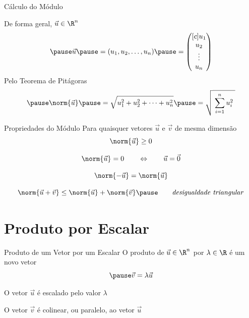\documentclass[fleqn,utf8,aspectratio=169,12pt]{beamer}
\begin{document}
\begin{frame}[t]{Cálculo do Módulo}
  \vspace{1\baselineskip}

  De forma geral, $\vec{u} \in \R^n$
  \[
    \pause
    \vec{u}
    \pause
    = ( u_1, u_2, \dots, u_n )
    \pause
    = \begin{pmatrix}[c]
      u_1 \\
      u_2 \\
      \vdots \\
      u_n
    \end{pmatrix}
  \]
  \pause
  Pelo Teorema de Pitágoras
  \[
    \pause
    \norm{\vec{u}}
    \pause
    = \sqrt{ u_1^2 + u_2^2 + \cdots + u_n^2 }
    \pause
    = \sqrt{ \; \sum_{i=1}^{n} u_i^2 \; }
  \]
\end{frame}

\begin{frame}{Propriedades do Módulo}
  Para quaisquer vetores $\vec{u}$ e $\vec{v}$ de mesma dimensão
  \pause
  \[
    \norm{\vec{u}} \geq 0
  \]

  \pause
  \[
    \norm{\vec{u}} = 0
    \qquad\Leftrightarrow\qquad
    \vec{u} = \vec{0}
  \]

  \pause
  \[
    \norm{-\vec{u}} = \norm{\vec{u}}
  \]

  \pause
  \[
    \norm{\vec{u}+\vec{v}}
    \leq
    \norm{\vec{u}} + \norm{\vec{v}}
    \pause
    \qquad
    \text{\emph{desigualdade triangular}}
  \]
\end{frame}




\section{Produto por Escalar}

\begin{frame}{Produto de um Vetor por um Escalar}
  O produto de $\vec{u} \in \R^n$
  \pause
  por $\lambda \in \R$ é um novo vetor
  \[
    \pause
    \vec{v} = \lambda \vec{u}
  \]

  \pause
  O vetor $\vec{u}$ é escalado pelo valor $\lambda$

  \pause
  O vetor $\vec{v}$ é colinear, ou paralelo, ao vetor $\vec{u}$
\end{frame}
\end{document}
